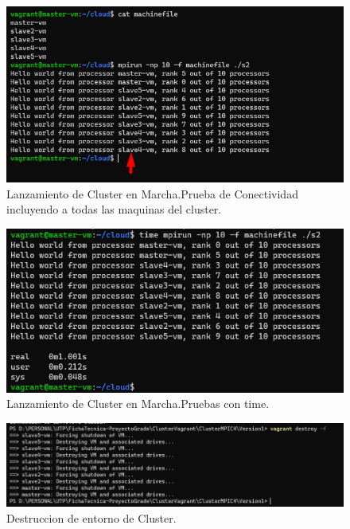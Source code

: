 \documentclass[letterpaper, 12pt, oneside]{article}
\begin{document}
     \begin{figure}[H] \centering
            \includegraphics[scale=1.3]{img/provision/version1fin4.png}
            \caption{Lanzamiento de Cluster en Marcha.Prueba de Conectividad incluyendo a todas las maquinas del cluster.}
            \label{fig:checkcluster2}
    \end{figure}
    
     \begin{figure}[H] \centering
            \includegraphics[scale=1.4]{img/provision/version1fin5.png}
            \caption{Lanzamiento de Cluster en Marcha.Pruebas con time.}
            \label{fig:checkcluster2}
    \end{figure}
    
    \begin{figure}[H] \centering
            \includegraphics[scale=1.4]{img/provision/version1fin6.png}
            \caption{Destruccion de entorno de Cluster.}
            \label{fig:checkcluster2}
    \end{figure}
    
\end{document}
